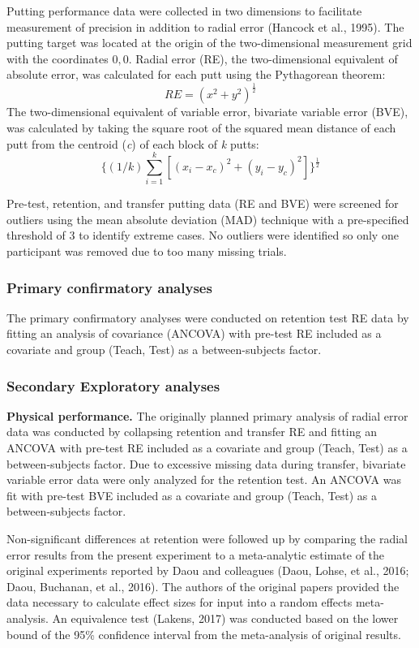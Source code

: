 \documentclass[
  english,
  man,floatsintext]{apa7}
\begin{document}
Putting performance data were collected in two dimensions to facilitate measurement of precision in addition to radial error (Hancock et al., 1995). The putting target was located at the origin of the two-dimensional measurement grid with the coordinates \(0,0\). Radial error (RE), the two-dimensional equivalent of absolute error, was calculated for each putt using the Pythagorean theorem:
\[RE = (x^{2} + y^{2})^{\frac{1}{2}}\]
The two-dimensional equivalent of variable error, bivariate variable error (BVE), was calculated by taking the square root of the squared mean distance of each putt from the centroid (\emph{c}) of each block of \emph{k} putts:
\[\{(1/k)\sum_{i=1}^{k}[(x_{i} - x_{c})^{2} + (y_{i} - y_{c})^{2}]\}^{\frac{1}{2}}\]

Pre-test, retention, and transfer putting data (RE and BVE) were screened for outliers using the mean absolute deviation (MAD) technique with a pre-specified threshold of 3 to identify extreme cases. No outliers were identified so only one participant was removed due to too many missing trials.

\hypertarget{primary-confirmatory-analyses}{%
\subsubsection{Primary confirmatory analyses}\label{primary-confirmatory-analyses}}

The primary confirmatory analyses were conducted on retention test RE data by fitting an analysis of covariance (ANCOVA) with pre-test RE included as a covariate and group (Teach, Test) as a between-subjects factor.

\hypertarget{secondary-exploratory-analyses}{%
\subsubsection{Secondary Exploratory analyses}\label{secondary-exploratory-analyses}}

\textbf{Physical performance.} The originally planned primary analysis of radial error data was conducted by collapsing retention and transfer RE and fitting an ANCOVA with pre-test RE included as a covariate and group (Teach, Test) as a between-subjects factor. Due to excessive missing data during transfer, bivariate variable error data were only analyzed for the retention test. An ANCOVA was fit with pre-test BVE included as a covariate and group (Teach, Test) as a between-subjects factor.

Non-significant differences at retention were followed up by comparing the radial error results from the present experiment to a meta-analytic estimate of the original experiments reported by Daou and colleagues (Daou, Lohse, et al., 2016; Daou, Buchanan, et al., 2016). The authors of the original papers provided the data necessary to calculate effect sizes for input into a random effects meta-analysis. An equivalence test (Lakens, 2017) was conducted based on the lower bound of the 95\% confidence interval from the meta-analysis of original results.
\end{document}
